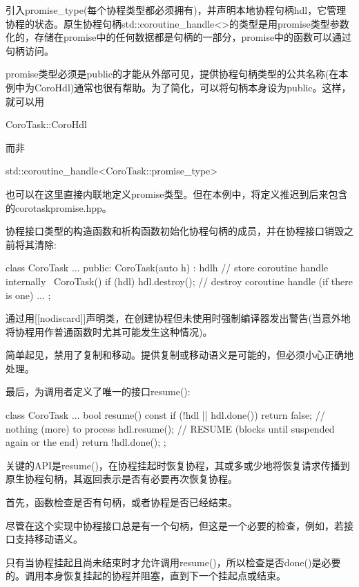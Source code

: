 引入promise\_type(每个协程类型都必须拥有)，并声明本地协程句柄hdl，它管理协程的状态。原生协程句柄std::coroutine\_handle<>的类型是用promise类型参数化的，存储在promise中的任何数据都是句柄的一部分，promise中的函数可以通过句柄访问。

promise类型必须是public的才能从外部可见，提供协程句柄类型的公共名称(在本例中为CoroHdl)通常也很有帮助。为了简化，可以将句柄本身设为public。这样，就可以用

\begin{cpp}
CoroTask::CoroHdl
\end{cpp}

而非

\begin{cpp}
std::coroutine_handle<CoroTask::promise_type>
\end{cpp}

也可以在这里直接内联地定义promise类型。但在本例中，将定义推迟到后来包含的corotaskpromise.hpp。

协程接口类型的构造函数和析构函数初始化协程句柄的成员，并在协程接口销毁之前将其清除:

\begin{cpp}
class CoroTask {
	...
	public:
	CoroTask(auto h)
	: hdl{h} { // store coroutine handle internally
	}
	~CoroTask() {
		if (hdl) {
			hdl.destroy(); // destroy coroutine handle (if there is one)
		}
	}
	...
};
\end{cpp}

通过用[[nodiscard]]声明类，在创建协程但未使用时强制编译器发出警告(当意外地将协程用作普通函数时尤其可能发生这种情况)。

简单起见，禁用了复制和移动。提供复制或移动语义是可能的，但必须小心正确地处理。

最后，为调用者定义了唯一的接口resume():

\begin{cpp}
class CoroTask {
	...
	bool resume() const {
		if (!hdl || hdl.done()) {
			return false; // nothing (more) to process
		}
		hdl.resume(); // RESUME (blocks until suspended again or the end)
		return !hdl.done();
	}
};
\end{cpp}

关键的API是resume()，在协程挂起时恢复协程，其或多或少地将恢复请求传播到原生协程句柄，其返回表示是否有必要再次恢复协程。

首先，函数检查是否有句柄，或者协程是否已经结束。

尽管在这个实现中协程接口总是有一个句柄，但这是一个必要的检查，例如，若接口支持移动语义。

只有当协程挂起且尚未结束时才允许调用resume()，所以检查是否done()是必要的。调用本身恢复挂起的协程并阻塞，直到下一个挂起点或结束。

